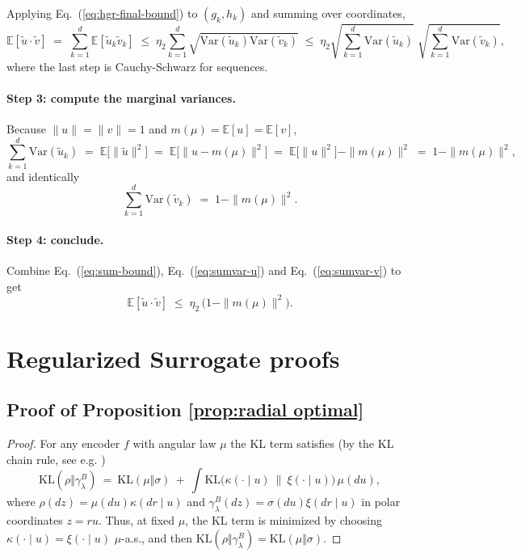 \documentclass{article}
\newcommand{\E}{\mathbb{E}}
\newcommand{\Var}{\mathrm{Var}}
\newcommand{\KL}{\mathrm{KL}}
\renewcommand{\eqref}[1]{Eq.~(\ref{#1})}
\begin{document}
Applying \eqref{eq:hgr-final-bound} to $(g_k,h_k)$ and summing over coordinates,
\begin{equation}
\label{eq:sum-bound}
\E[\tilde u \cdot \tilde v]
\;=\; \sum_{k=1}^d \E[\tilde u_k \tilde v_k]
\;\le\; \eta_2 \sum_{k=1}^d \sqrt{\Var(\tilde u_k)\Var(\tilde v_k)}
\;\le\; \eta_2 \sqrt{\sum_{k=1}^d \Var(\tilde u_k)}\;\sqrt{\sum_{k=1}^d \Var(\tilde v_k)} ,
\end{equation}
where the last step is Cauchy-Schwarz for sequences.

\paragraph{Step 3: compute the marginal variances.}
Because $\|u\|=\|v\|=1$ and $m(\mu)=\E[u]=\E[v]$,
\begin{equation}
\label{eq:sumvar-u}
\sum_{k=1}^d \Var(\tilde u_k)
\;=\; \E\!\big[\|\tilde u\|^2\big]
\;=\; \E\!\big[\|u-m(\mu)\|^2\big]
\;=\; \E\!\big[\|u\|^2\big]-\|m(\mu)\|^2
\;=\; 1 - \|m(\mu)\|^2 ,
\end{equation}
and identically
\begin{equation}
\label{eq:sumvar-v}
\sum_{k=1}^d \Var(\tilde v_k)
\;=\; 1 - \|m(\mu)\|^2 .
\end{equation}

\paragraph{Step 4: conclude.}
Combine \eqref{eq:sum-bound}, \eqref{eq:sumvar-u} and \eqref{eq:sumvar-v} to get
\begin{equation}
\label{eq:residual-final}
\E[\tilde u \cdot \tilde v]
\;\le\; \eta_2 \,\big(1 - \|m(\mu)\|^2\big).
\end{equation}

\section{Regularized Surrogate proofs}
\label{app:reg_proof}

\subsection{Proof of Proposition \ref{prop:radial optimal}}
\label{app:reg_prop_proof}

\begin{proof}
For any encoder $f$ with angular law $\mu$ the KL term satisfies (by the KL chain rule, see e.g. \citealp[Theorem B.2.1]{dupuis2011weak})
\begin{equation}
\KL(\rho\Vert\gamma_\lambda^{B})\ =\ \KL(\mu\Vert\sigma)\ +\ \int \KL\!\big(\kappa(\cdot\mid u)\ \|\ \xi(\cdot\mid u)\big)\,\mu(du),
\end{equation}
where $\rho(dz)=\mu(du)\kappa(dr\mid u)$ and $\gamma_\lambda^{B}(dz)=\sigma(du)\xi(dr\mid u)$ in polar coordinates $z=ru$. Thus, at fixed $\mu$, the KL term is minimized by choosing $\kappa(\cdot\mid u)=\xi(\cdot\mid u)$ $\mu$-a.s., and then $\KL(\rho\Vert\gamma_\lambda^{B})=\KL(\mu\Vert\sigma)$. 
\end{proof}
\end{document}
